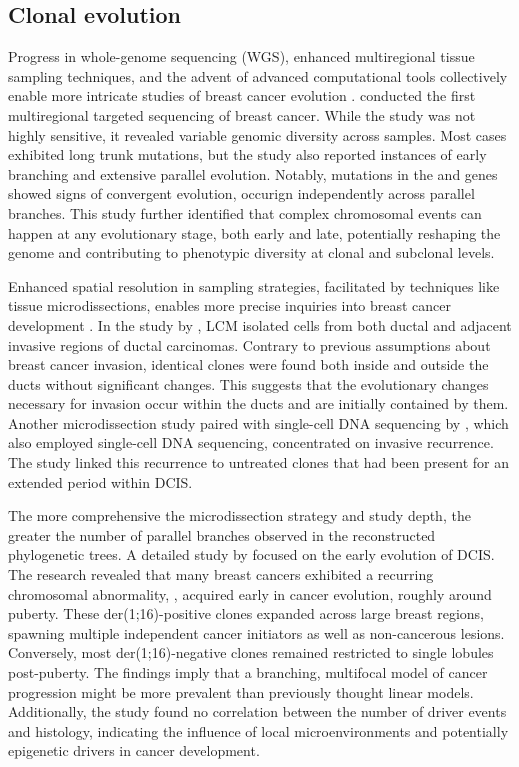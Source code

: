 \subsection{Clonal evolution}

Progress in whole-genome sequencing (WGS), enhanced multiregional tissue sampling techniques, and the advent of advanced computational tools collectively enable more intricate studies of breast cancer evolution . \textcite{Yates2015-xk} conducted the first multiregional targeted sequencing of breast cancer. While the study was not highly sensitive, it revealed variable genomic diversity across samples. Most cases exhibited long trunk mutations, but the study also reported instances of early branching and extensive parallel evolution. Notably, mutations in the  and  genes showed signs of convergent evolution, occurign independently across parallel branches. This study further identified that complex chromosomal events can happen at any evolutionary stage, both early and late, potentially reshaping the genome and contributing to phenotypic diversity at clonal and subclonal levels.

Enhanced spatial resolution in sampling strategies, facilitated by techniques like tissue microdissections, enables more precise inquiries into breast cancer development . In the study by \textcite{Casasent2018-gx}, \ac{LCM} isolated cells from both ductal and adjacent invasive regions of ductal carcinomas. Contrary to previous assumptions about breast cancer invasion, identical clones were found both inside and outside the ducts without significant changes. This suggests that the evolutionary changes necessary for invasion occur within the ducts and are initially contained by them. Another microdissection study paired with single-cell DNA sequencing by \textcite{Lips2022-kv}, which also employed single-cell DNA sequencing, concentrated on invasive recurrence. The study linked this recurrence to untreated clones that had been present for an extended period within \ac{DCIS}.

The more comprehensive the microdissection strategy and study depth, the greater the number of parallel branches observed in the reconstructed phylogenetic trees. A detailed study by \parencite{Nishimura2023-mk} focused on the early evolution of \ac{DCIS}. The research revealed that many breast cancers exhibited a recurring chromosomal abnormality, , acquired early in cancer evolution, roughly around puberty. These der(1;16)-positive clones expanded across large breast regions, spawning multiple independent cancer initiators as well as non-cancerous lesions. Conversely, most der(1;16)-negative clones remained restricted to single lobules post-puberty. The findings imply that a branching, multifocal model of cancer progression might be more prevalent than previously thought linear models. Additionally, the study found no correlation between the number of driver events and histology, indicating the influence of local microenvironments and potentially epigenetic drivers in cancer development.

